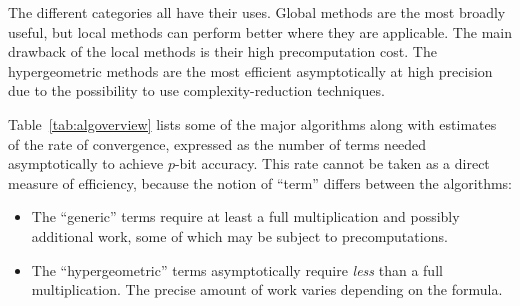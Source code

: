 \documentclass[reqno]{amsart}
\theoremstyle{definition}
\begin{document}
The different categories all have their uses.
Global methods are the most broadly useful,
but local methods can
perform better where they are applicable. The main drawback
of the local methods is their high precomputation cost.
The hypergeometric methods are the most efficient asymptotically at high precision
due to the possibility to use complexity-reduction techniques.

Table~\ref{tab:algoverview} lists some of the major
algorithms along with estimates of
the rate of convergence, expressed as the number of terms needed asymptotically to
achieve $p$-bit accuracy.
This rate cannot be taken as a direct measure of efficiency,
because the notion of ``term'' differs between the algorithms:
\begin{itemize}
\item The ``generic'' terms require at least a full multiplication
and possibly additional work, some of which
may be subject to precomputations.
\item The ``hypergeometric'' terms
asymptotically require \emph{less} than a full multiplication.
The precise amount of work varies depending on the formula.
\end{itemize}
\end{document}
